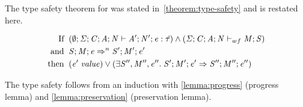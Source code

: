 
The type safety theorem for \ourcalc{} was stated in~\ref{theorem:type-safety} and is restated here.

\begin{theorem}
\begin{displaymath}
  \begin{aligned}
  \text{If} \;\; & (\emptyset;\mathit{\Sigma};\mathit{C};\mathit{A};\mathit{N} \vdash \mathit{A}';\mathit{N}';\mathit{e} : \mathit{\hat{\tau}}) \wedge
                   (\mathit{\Sigma};\mathit{C};\mathit{A};\mathit{N} \vdash_{wf} \mathit{M};\mathit{S}) \\
  \text{and} \;\; & \mathit{S};\mathit{M};\mathit{e} \Rightarrow^n \mathit{S}';\mathit{M}';\mathit{e}' \\
  \text{then} \;\; & (\mathit{e}' \; \mathit{value}) \vee
                     (\exists \mathit{S}'', \mathit{M}'', \mathit{e}'' . \; \mathit{S}';\mathit{M}';\mathit{e}' \Rightarrow \mathit{S}'';\mathit{M}'';\mathit{e}'')
  \end{aligned}
  \end{displaymath}
\end{theorem}

\begin{nproof}
  The type safety follows from an induction with
  \ref{lemma:progress} (progress lemma) and \ref{lemma:preservation} (preservation lemma).
\end{nproof}
